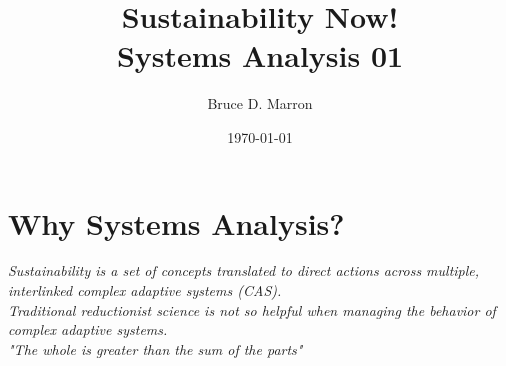\documentclass{beamer}
\title{Sustainability Now! \\
Systems Analysis 01}
\date{\today}
\author{Bruce D. Marron}
\begin{document}
\begin{frame}
  \titlepage
\end{frame}


\section{Why Systems Analysis?}

\begin{frame}
\large \textit{Sustainability is a set of concepts translated to direct actions across multiple,
interlinked complex adaptive systems (CAS).}\\
\vspace{5 mm}
\large \textit{Traditional reductionist science is not so helpful when managing the behavior of complex adaptive systems.}\\
\vspace{6 mm}
\large \textit{"The whole is greater than the sum of the parts"}
\end{frame}



\end{document}

